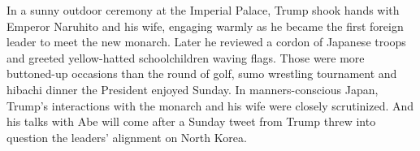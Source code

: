 \documentclass[final,doctor,korean,pdfdoc]{konkukthesis}
\author[korean]{김 혁}
\author[hanja]{金 爀}
\author[english]{KIM, Hyeok}
\begin{document}
\makecontents
  \begin{abstractEng}
In a sunny outdoor ceremony at the Imperial Palace, Trump shook hands with Emperor Naruhito and his wife, engaging warmly as he became the first foreign leader to meet the new monarch. Later he reviewed a cordon of Japanese troops and greeted yellow-hatted schoolchildren waving flags.
Those were more buttoned-up occasions than the round of golf, sumo wrestling tournament and hibachi dinner the President enjoyed Sunday. In manners-conscious Japan, Trump's interactions with the monarch and his wife were closely scrutinized. And his talks with Abe will come after a Sunday tweet from Trump threw into question the leaders' alignment on North Korea.
  \end{abstractEng}
\main
\end{document}
